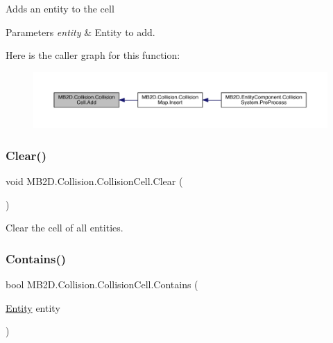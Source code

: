 Adds an entity to the cell 


\begin{DoxyParams}{Parameters}
{\em entity} & Entity to add.\\
\hline
\end{DoxyParams}
Here is the caller graph for this function\+:
\nopagebreak
\begin{figure}[H]
\begin{center}
\leavevmode
\includegraphics[width=350pt]{class_m_b2_d_1_1_collision_1_1_collision_cell_a4fc338d7dbfd7418f5493424c5937213_icgraph}
\end{center}
\end{figure}
\hypertarget{class_m_b2_d_1_1_collision_1_1_collision_cell_ae4ff144f6c768003d8be46e17e130646}{}\label{class_m_b2_d_1_1_collision_1_1_collision_cell_ae4ff144f6c768003d8be46e17e130646} 
\subsubsection{\texorpdfstring{Clear()}{Clear()}}
{\footnotesize\ttfamily void M\+B2\+D.\+Collision.\+Collision\+Cell.\+Clear (\begin{DoxyParamCaption}{ }\end{DoxyParamCaption})\hspace{0.3cm}{\ttfamily [inline]}}



Clear the cell of all entities. 

\hypertarget{class_m_b2_d_1_1_collision_1_1_collision_cell_aa4be244387541ee24d88da80331b3438}{}\label{class_m_b2_d_1_1_collision_1_1_collision_cell_aa4be244387541ee24d88da80331b3438} 
\subsubsection{\texorpdfstring{Contains()}{Contains()}}
{\footnotesize\ttfamily bool M\+B2\+D.\+Collision.\+Collision\+Cell.\+Contains (\begin{DoxyParamCaption}\item[{\hyperlink{class_m_b2_d_1_1_entity_component_1_1_entity}{Entity}}]{entity }\end{DoxyParamCaption})\hspace{0.3cm}{\ttfamily [inline]}}



